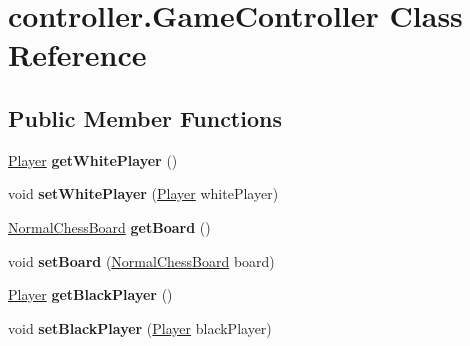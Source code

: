 \hypertarget{classcontroller_1_1_game_controller}{\section{controller.\-Game\-Controller Class Reference}
\label{classcontroller_1_1_game_controller}
}
\subsection*{Public Member Functions}
\begin{DoxyCompactItemize}
\item 
\hypertarget{classcontroller_1_1_game_controller_af090f5bbd48d928c938d95b621b1052e}{\hyperlink{classmodel_1_1player_1_1_player}{Player} {\bfseries get\-White\-Player} ()}\label{classcontroller_1_1_game_controller_af090f5bbd48d928c938d95b621b1052e}

\item 
\hypertarget{classcontroller_1_1_game_controller_a47381ecd7a8eae0810518da300333464}{void {\bfseries set\-White\-Player} (\hyperlink{classmodel_1_1player_1_1_player}{Player} white\-Player)}\label{classcontroller_1_1_game_controller_a47381ecd7a8eae0810518da300333464}

\item 
\hypertarget{classcontroller_1_1_game_controller_a218e7a300d67b4a3ab3023293e7edc35}{\hyperlink{classmodel_1_1board_1_1_normal_chess_board}{Normal\-Chess\-Board} {\bfseries get\-Board} ()}\label{classcontroller_1_1_game_controller_a218e7a300d67b4a3ab3023293e7edc35}

\item 
\hypertarget{classcontroller_1_1_game_controller_aa83f54d3d768c52bc9c3e755b0fb4017}{void {\bfseries set\-Board} (\hyperlink{classmodel_1_1board_1_1_normal_chess_board}{Normal\-Chess\-Board} board)}\label{classcontroller_1_1_game_controller_aa83f54d3d768c52bc9c3e755b0fb4017}

\item 
\hypertarget{classcontroller_1_1_game_controller_a59a1f07c5977a530aad3cdf8894f78b5}{\hyperlink{classmodel_1_1player_1_1_player}{Player} {\bfseries get\-Black\-Player} ()}\label{classcontroller_1_1_game_controller_a59a1f07c5977a530aad3cdf8894f78b5}

\item 
\hypertarget{classcontroller_1_1_game_controller_aa0cf94575b2abba1e406ec9d30f8ecda}{void {\bfseries set\-Black\-Player} (\hyperlink{classmodel_1_1player_1_1_player}{Player} black\-Player)}\label{classcontroller_1_1_game_controller_aa0cf94575b2abba1e406ec9d30f8ecda}


\end{DoxyCompactItemize}
